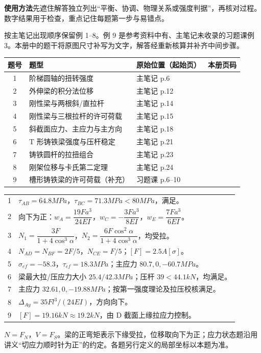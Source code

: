 \documentclass[a4paper,10pt,fontset=none]{ctexart}
\begin{document}
\fontsize{10.5}{15}\selectfont
{}
\begin{answerbox}
\textbf{使用方法}\quad 先遮住解答独立列出“平衡、协调、物理关系或强度判据”，再核对过程。数字结果用于检查，重点记住每题第一步与易错点。
\end{answerbox}
按主笔记出现顺序保留例 1--8。例 9 是参考资料中有、主笔记未收录的习题课例 3。本册中的题干将原图尺寸补写为文字，解答经重新核算并补齐中间步骤。
\vspace{2mm}
\par\begin{tabularx}{\linewidth}{@{}cXlc@{}}
\toprule
题号 & 题型 & 原始位置（起始页） & 本册页码\\\midrule
1 & 阶梯圆轴的扭转强度 & 主笔记 p.6 & \pageref{ex:1}\\
2 & 外伸梁的积分法位移 & 主笔记 p.12 & \pageref{ex:2}\\
3 & 刚性梁与两根斜/直拉杆 & 主笔记 p.14 & \pageref{ex:3}\\
4 & 刚性梁与三根拉杆的许可荷载 & 主笔记 p.15 & \pageref{ex:4}\\
5 & 斜截面应力、主应力与主方向 & 主笔记 p.18 & \pageref{ex:5}\\
6 & T 形铸铁梁强度与压杆稳定 & 主笔记 p.21 & \pageref{ex:6}\\
7 & 铸铁圆杆的拉扭组合 & 主笔记 p.23 & \pageref{ex:7}\\
8 & 刚架位移与卡氏第二定理 & 主笔记 p.24 & \pageref{ex:8}\\
9 & 槽形铸铁梁的许可荷载（补充） & 习题课 p.6--10 & \pageref{ex:9}\\\bottomrule
\end{tabularx}\par
{}
\par\begin{tabularx}{\linewidth}{@{}cX@{}}
\toprule
1 & $\tau_{AB}=64.8\unit{MPa}$，$\tau_{BC}=71.3\unit{MPa}<80\unit{MPa}$，满足。\\
2 & 向下为正：$w_A=\dfrac{19Fa^3}{24EI}$，$w_C=-\dfrac{3Fa^3}{8EI}$，$w_E=\dfrac{7Fa^3}{6EI}$。\\[3pt]
3 & $N_1=\dfrac{3F}{1+4\cos^3\alpha}$，$N_2=\dfrac{6F\cos^2\alpha}{1+4\cos^3\alpha}$，均受拉。\\[3pt]
4 & $N_{AD}=N_{BF}=2F/5$，$N_{CE}=F/5$；$[F]=2.5A[\sigma]$。\\
5 & $\sigma_{ef}=-58.3$，$\tau_{ef}=18.3\unit{MPa}$；主应力 $80.7,0,-60.7\unit{MPa}$。\\
6 & 梁最大拉/压应力大小 $25.4/42.3\unit{MPa}$；压杆 $39<44.1\unit{kN}$，均满足。\\
7 & 主应力 $32.61,0,-19.88\unit{MPa}$；按第一强度理论及拉压校核满足。\\
8 & $\Delta_{Ay}=35Fl^3/(24EI)$，方向向下。\\
9 & $[F]=19.16\unit{kN}\approx19.2\unit{kN}$，由 D 截面上缘拉应力控制。\\\bottomrule
\end{tabularx}\par
{}
$N=F_N$，$V=F_S$。梁的正弯矩表示下缘受拉，位移取向下为正；应力状态题沿用讲义“切应力顺时针为正”的约定。各题另行定义的局部坐标以本题为准。
\end{document}
